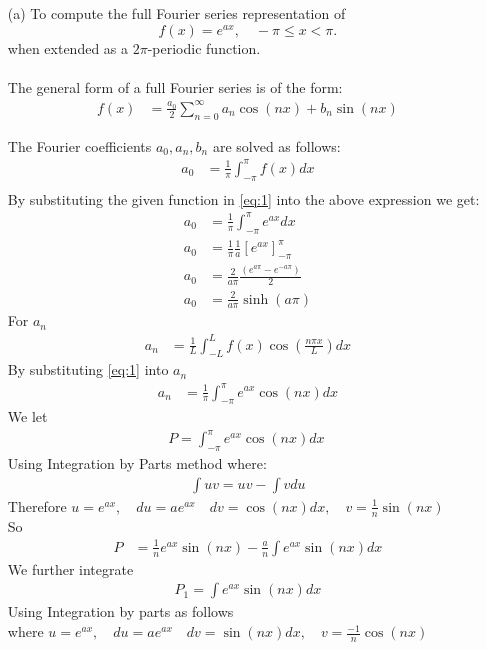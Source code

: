 \documentclass[12pt,a4paper]{article}
\begin{document}
\begin{enumerate}
		\item[(a)] To compute the full Fourier series representation of
				\begin{equation}
					f(x)=e^{ax}, \quad -\pi\le x< \pi.
					\label{eq:1}
				\end{equation}
			when extended as a $2\pi$-periodic function.\\\ \\
			The general form of a full Fourier series is of the form: 
					\begin{align}
							f(x) &= \frac{a_0}{2} \sum_{n=0}^\infty a_n\cos(nx) + b_n\sin(nx)
							\label{eq:2}
					\end{align}

The Fourier coefficients $a_0, a_n, b_n$ are solved as follows:\\
\begin{align*}
	a_0 &= \frac{1}{\pi}\int_{-\pi}^{\pi} f(x)dx\\
\end{align*}
By substituting the given function in \eqref{eq:1} into the above expression we get:
\begin{align*}
  	a_0 &=\frac{1}{\pi}\int_{-\pi}^{\pi}e^{ax}dx\\
	a_0 &=\frac{1}{\pi}\frac{1}{a}\left[e^{ax}\right]_{-\pi}^{\pi}\\
	a_0 &=\frac{2}{a\pi}\frac{\left(e^{a\pi}-e^{-a\pi}\right)}{2}\\
	a_0 &=\frac{2}{a\pi}\sinh(a\pi)
\end{align*}
For $a_n$\\
\begin{align*}
    a_n &=\frac{1}{L}\int_{-L}^{L}f(x)\cos\left(\frac{n\pi x}{L}\right)dx
\end{align*}
By substituting \eqref{eq:1} into $a_n$\\
\begin{align*}
      a_n &=\frac{1}{\pi}\int_{-\pi}^{\pi}e^{ax}\cos(nx)dx
\end{align*}
We let 
\begin{align*}
		 P=\int_{-\pi}^{\pi}e^{ax}\cos(nx)dx\
\end{align*}
Using Integration by Parts method where:
\begin{align*}
		\int  uv =  uv - \int v du
\end{align*}
Therefore 
$u=e^{ax}  ,\quad  du=ae^{ax}  \quad dv=\cos(nx)dx,\quad  v =\frac{1}{n}\sin(nx)$\\
So 
\begin{align*}
P &=\frac{1}{n}e^{ax}\sin(nx) -\frac{a}{n}\int e^{ax}\sin(nx) dx
\end{align*}
We further integrate 
\begin{align*}
   P_1=\int e^{ax}\sin(nx)dx
\end{align*}
Using Integration by parts as follows\\
where $ u=e^{ax}, \quad du=ae^{ax} \quad dv=\sin(nx)dx, \quad v=\frac{-1}{n}\cos(nx)$\\


\end{enumerate}
\end{document}
